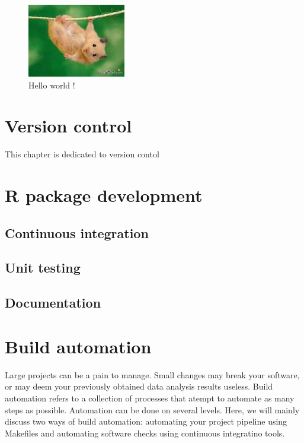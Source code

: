 \documentclass[]{book}
\begin{document}
\begin{figure}
\centering
\includegraphics{./Figures/funny_mouse.jpg}
\caption{Hello world !}
\end{figure}

\chapter{Version control}\label{version-control}

This chapter is dedicated to version contol

\chapter{R package development}\label{r-package-development}

\section{Continuous integration}\label{continuous-integration}

\section{Unit testing}\label{unit-testing}

\section{Documentation}\label{documentation}

\chapter{Build automation}\label{build-automation}

Large projects can be a pain to manage. Small changes may break your
software, or may deem your previously obtained data analysis results
useless. Build automation refers to a collection of processes that
atempt to automate as many steps as possible. Automation can be done on
several levels. Here, we will mainly discuss two ways of build
automation: automating your project pipeline using Makefiles and
automating software checks using continuous integratino tools.
\end{document}
